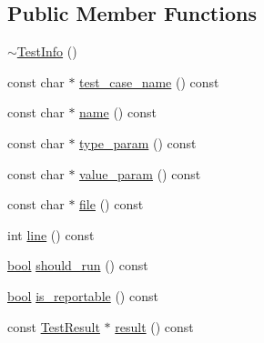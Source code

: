 \subsection*{Public Member Functions}
\begin{DoxyCompactItemize}
\item 
\hyperlink{classtesting_1_1TestInfo_a8d382c1b1b511f0d9112c14684809852}{$\sim$\+Test\+Info} ()
\item 
const char $\ast$ \hyperlink{classtesting_1_1TestInfo_a036a20710c8c2252889544daba9a8ff9}{test\+\_\+case\+\_\+name} () const
\item 
const char $\ast$ \hyperlink{classtesting_1_1TestInfo_ac2581b45eccc9a3b94cb41c4807d0e34}{name} () const
\item 
const char $\ast$ \hyperlink{classtesting_1_1TestInfo_a7759bc57f4350ad406cbbb0b3bcea320}{type\+\_\+param} () const
\item 
const char $\ast$ \hyperlink{classtesting_1_1TestInfo_abdf2c6cfcf4819e725816c64e1c1fc24}{value\+\_\+param} () const
\item 
const char $\ast$ \hyperlink{classtesting_1_1TestInfo_a9b74d79cf618ce5bb0d0b1da75ee8b35}{file} () const
\item 
int \hyperlink{classtesting_1_1TestInfo_af5931cfc594b5d660c56b3c61c41ea13}{line} () const
\item 
\hyperlink{classbool}{bool} \hyperlink{classtesting_1_1TestInfo_a866e33b5bc5ab2a6e5375fc7d3af0f96}{should\+\_\+run} () const
\item 
\hyperlink{classbool}{bool} \hyperlink{classtesting_1_1TestInfo_a63e7042028b0b846f4b5a1e5bcffc079}{is\+\_\+reportable} () const
\item 
const \hyperlink{classtesting_1_1TestResult}{Test\+Result} $\ast$ \hyperlink{classtesting_1_1TestInfo_aee8cb884c95cd446129aba936b4159e0}{result} () const
\end{DoxyCompactItemize}

